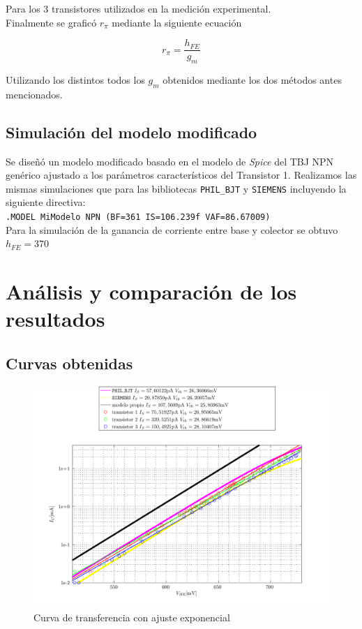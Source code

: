 \documentclass[10pt,spanish,a4paper,openany,notitlepage]{article}
\begin{document}
Para los 3 transistores utilizados en la medición experimental.\\

Finalmente se graficó $r_\pi$ mediante la siguiente ecuación

\[ \displaystyle r_\pi = \frac{h_{FE}}{g_m} \]

Utilizando los distintos todos los $g_m$ obtenidos mediante los dos métodos antes mencionados.

\subsection{Simulación del modelo modificado}

Se diseñó un modelo modificado basado en el modelo de \emph{Spice} del TBJ NPN genérico ajustado a los parámetros característicos del Transistor 1. Realizamos las mismas simulaciones que para las bibliotecas \texttt{PHIL\_BJT} y \texttt{SIEMENS} incluyendo la siguiente directiva:\\

\texttt{.MODEL MiModelo NPN (BF=361 IS=106.239f VAF=86.67009)}\\

Para la simulación de la ganancia de corriente entre base y colector se obtuvo $h_{FE} = 370$

\section{Análisis y comparación de los resultados}

\subsection{Curvas obtenidas}

\begin{figure}[H] %
\begin{center}
\includegraphics[scale=0.7]{./Octave/IdvsVbe_exp.pdf}
\caption{Curva de transferencia con ajuste exponencial}
 \label{fig:transferencia_exp}
\end{center}
\end{figure}
\end{document}
